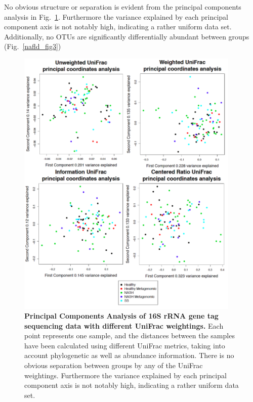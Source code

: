 No obvious structure or separation is evident from the principal components analysis in Fig.~\ref{nafld_fig2}. Furthermore the variance explained by each principal component axis is not notably high, indicating a rather uniform data set. Additionally, no OTUs are significantly differentially abundant between groups (Fig.~\ref{nafld_fig3})

\begin{figure}[h]
\begin{center}
\includegraphics[width=0.95\textwidth]{nafld_16s_pcoa.png}
\caption{\textbf{Principal Components Analysis of 16S rRNA gene tag sequencing data with different UniFrac weightings.} Each point represents one sample, and the distances between the samples have been calculated using different UniFrac metrics, taking into account phylogenetic as well as abundance information. There is no obvious separation between groups by any of the UniFrac weightings. Furthermore the variance explained by each principal component axis is not notably high, indicating a rather uniform data set.}
\end{center}
\label{nafld_fig2}
\end{figure}

